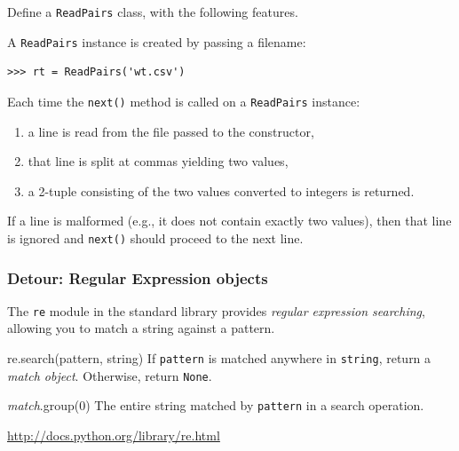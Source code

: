 \documentclass[english,serif,mathserif,xcolor=pdftex,dvipsnames,table]{beamer}
\begin{document}
\begin{frame}[fragile]
  \begin{exercise}\small
    Define a \texttt{ReadPairs} class, with the following features.

    \+ A \texttt{ReadPairs} instance is created by passing a filename:
\begin{lstlisting}
>>> rt = ReadPairs('wt.csv')
\end{lstlisting}

    \+ Each time the \texttt{next()} method is called on a \texttt{ReadPairs} instance:
    \begin{enumerate}
    \item a line is read from the file passed to the constructor,
    \item that line is split at commas yielding two values,
    \item a 2-tuple consisting of the two values converted to integers is returned.
    \end{enumerate}

    \+ If a line is malformed (e.g., it does not contain exactly two
    values), then that line is ignored and \texttt{next()} should
    proceed to the next line.
  \end{exercise}
\end{frame}


\begin{frame}
  \frametitle{Detour: Regular Expression objects}
  The \texttt{re} module in the standard library provides
  \emph{regular expression searching}, allowing you to match a string
  against a pattern.

  \+
  \begin{describe}{re.search(pattern, string)}
    If \texttt{pattern} is matched anywhere in \texttt{string}, return
    a \emph{match object}.  Otherwise, return \texttt{None}.
  \end{describe}

  \+
  \begin{describe}{\emph{match}.group(0)}
    The entire string matched by \texttt{pattern} in a search operation.
  \end{describe}

  \+
  \begin{references}
    \url{http://docs.python.org/library/re.html}
  \end{references}
\end{frame}
\end{document}
